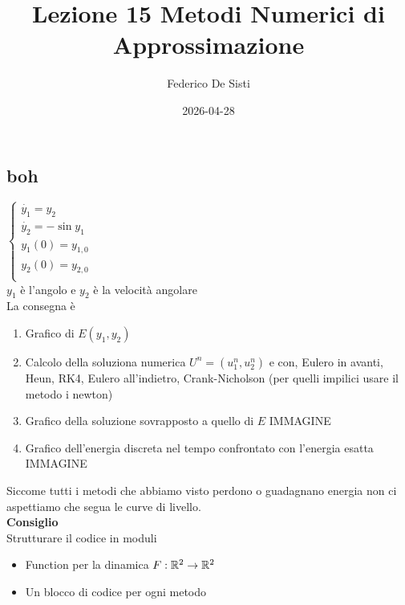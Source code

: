 \documentclass[12px]{article}
\title{Lezione 15 Metodi Numerici di Approssimazione}
\date{2026-04-28}
\author{Federico De Sisti}
\begin{document}
	\maketitle
	\newpage
	\subsection{boh}$
	 \begin{cases}
		 \dot {y_1} = y_2\\
		 \dot {y_2} = -\sin y_1\\
		y_1(0) = y_{1,0}\\
		y_2(0) = y_{2,0}\\
	 \end{cases}$\\
$y_1$ è l'angolo e $y_2$ è la velocità angolare\\
La consegna è
\begin{enumerate}
	\item Grafico di  $E(y_1,y_2)$
	\item Calcolo della soluziona numerica $U^n = (u_1^n, u_2^n)$ e con, Eulero in avanti, Heun, RK4, Eulero all'indietro, Crank-Nicholson (per quelli impilici usare il metodo i newton)
	\item Grafico della soluzione sovrapposto a quello di $E$ IMMAGINE
	\item Grafico dell'energia discreta nel tempo confrontato con l'energia esatta IMMAGINE
\end{enumerate}
Siccome tutti i metodi che abbiamo visto perdono o guadagnano energia non ci aspettiamo che segua le curve di livello.\\
\textbf{Consiglio}\\
Strutturare il codice in moduli
\begin{itemize}
	\item Function per la dinamica $F:\mathbb{R}^2 \rightarrow \mathbb{R}^2$
	\item Un blocco di codice per ogni metodo
\end{itemize}



	
\end{document}
